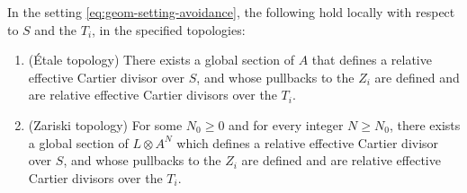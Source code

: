 \begin{lemma}\label{lemma:prime-avoidance-families}
In the setting \eqref{eq:geom-setting-avoidance}, the following hold locally with respect to $S$ and the $T_{i}$, in the specified topologies:
\begin{enumerate}
\item\label{item:prime-avoidance-families-1} (Étale topology) There exists a global section of $A$ that defines a relative effective Cartier divisor over $S$, and whose pullbacks to the $Z_{i}$ are defined and are relative effective Cartier divisors over the $T_{i}$.
\item\label{item:prime-avoidance-families-2} (Zariski topology) For some $N_{0}\geq 0$ and for every integer $N\geq N_{0}$, there exists a global section of $L\otimes A^{N}$ which defines a relative effective Cartier divisor over $S$, and whose pullbacks to the $Z_{i}$ are defined and are relative effective Cartier divisors over the $T_{i}$.
\end{enumerate}

\end{lemma}
